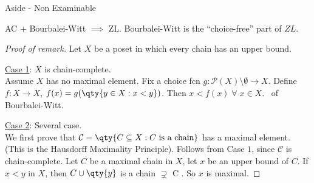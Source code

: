 \begin{aside}{Aside - Non Examinable}
    \begin{remark}
        AC + Bourbalei-Witt $\implies$ ZL. Bourbalei-Witt is the ``choice-free'' part of $ZL$.
    \end{remark}

    \begin{proof}[Proof of remark]
        Let $X$ be a poset in which every chain has an upper bound.

        \underline{Case 1}: $X$ is chain-complete. \\
        Assume $X$ has no maximal element.
        Fix a choice fcn $g : \mathcal{P}(X) \setminus \emptyset \to X$.
        Define $f : X \to X$, $f(x) = g(\qty{y \in X : x < y})$.
        Then $x < f(x) \; \forall \; x \in X$. \Lightning \ of Bourbalei-Witt.

        \underline{Case 2}: Several case. \\
        We first prove that $\mathcal{C} = \qty{C \subseteq X : C \text{ is a chain}}$ has a maximal element.
        (This is the Hausdorff Maximality Principle).
        Follows from Case $1$, since $\mathcal{C}$ is chain-complete.
        Let $C$ be a maximal chain in $X$, let $x$ be an upper bound of $C$.
        If $x < y$ in $X$, then $C \cup \qty{y}$ is a chain $\supsetneq$ C \Lightning.
        So $x$ is maximal.
    \end{proof}
\end{aside}